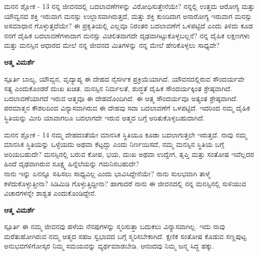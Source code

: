 \begin{mananam}{\mananamfont ಮನನ ಶ್ಲೋಕ - \textenglish{13}}
\footnotesize \mananamtext ನನ್ನ ಜೀವನದಲ್ಲಿ ಬದಲಾವಣೆಗಳನ್ನು ವಿರೋಧಿಸುತ್ತೇನೆಯೇ? ನನ್ನಲ್ಲಿ ಉತ್ತಮ ಆರೋಗ್ಯ ಮತ್ತು ಯೌವ್ವನದ ಶಕ್ತಿ ಇರುವಾಗ ಮನಸ್ಸು ಉಲ್ಲಾಸವಾಗಿರುತ್ತದೆ, ಮತ್ತು ಶಕ್ತಿ ಕುಂದಿದಾಗ ಅನಾರೋಗ್ಯ ಇರುವಾಗ ಮನಸ್ಸು ಅಸಮಾಧಾನ ಗೊಳ್ಳುತ್ತದೆಯೇ? ಈ ಪ್ರಕೃತಿಯಲ್ಲಿ ಎಲ್ಲವೂ ನಿರಂತರ ಬದಲಾವಣೆಗೆ ಒಳಪಟ್ಟಿದೆ ಎಂದು ತಿಳಿದು ಕೂಡ ನನಗೆ ದೈಹಿಕ ಬದಲಾವಣೆಗಳಾದಾಗ ಮನಸ್ಸು ವಿಚಲಿತವಾಗದೇ ದೃಢವಾಗಿಟ್ಟುಕೊಳ್ಳಬಲ್ಲನೆ? ನನ್ನ ದೈಹಿಕ ಲಕ್ಷಣಗಳು ಮತ್ತು ಮನಸ್ಸಿನ ಆಧಾರದ ಮೇಲೆ ನನ್ನ ಜೀವನದ ಮಿತಿಗಳನ್ನು ನನ್ನ ಮೇಲೆ ಹೇರಿಕೊಳ್ಳಲು ಸಾಧ್ಯವೇ?
\end{mananam}
\WritingHand\enspace\textbf{ಆತ್ಮ ವಿಮರ್ಶೆ}
\begin{inspiration}{\mananamfont ಸ್ಪೂರ್ತಿ}
\footnotesize \mananamtext ಬಾಲ್ಯ, ಯೌವ್ವನ, ವೃದ್ಯಾಪ್ಯ ಈ ದೇಹದ ನೈಸರ್ಗಿಕ ಪ್ರಕ್ರಿಯೆಯಾಗಿದೆ. ಯೌವನದಲ್ಲಿರುವ ಸೌಂದರ್ಯವೇ ಸತ್ಯ ಎಂದುಕೊಂಡರೆ ದುಃಖ ಖಚಿತ. ಮನಸ್ಸಿನ ನಿರ್ಮಲತೆ, ಶುದ್ಧತೆ ದೈಹಿಕ ಸೌಂದರ್ಯಕ್ಕಿಂತ ಶ್ರೇಷ್ಠವಾಗಿದೆ. ಬದಲಾವಣೆಯಾಗದೆ ಇರುವ ಆತ್ಮವೂ ಈ ದೇಹದೊಂದಿಗಿದೆ. ಈ ಆತ್ಮ ಸೌಂದರ್ಯವೂ ಅತ್ಯಂತ ಶ್ರೇಷ್ಠವಾಗಿದೆ. ಪರಮಾತ್ಮನ ಕೌಶಲದಿಂದ ವಿನ್ಯಾಸವಾಗಿರುವ ಈ ದೇಹವು ಸದಾ ಬದಲಾವಣೆಗೆ ಒಳಪಟ್ಟಿದೆ. ಇದರಿಂದ ನಮ್ಮ ದೈಹಿಕ ಸ್ಥಿತಿಯನ್ನು ಮೀರಿ ಯಾವಾಗಲೂ ಬದಲಾಗದೇ ಇರುವ ಆತ್ಮದ ಬಗ್ಗೆ ಅರಿತುಕೊಳ್ಳಬಹುದಾಗಿದೆ.
\end{inspiration}
\newpage

\begin{mananam}{\mananamfont ಮನನ ಶ್ಲೋಕ - \textenglish{14}}
\footnotesize \mananamtext ನಮ್ಮ ದೇಹದಂತೆಯೇ ಮಾನಸಿಕ ಸ್ಥಿತಿಯೂ ಕೂಡಾ ಬದಲಾಗುತ್ತಲೇ ಇರುತ್ತದೆ. ನಾವು ನಮ್ಮ ಮಾನಸಿಕ ಸ್ಥಿತಿಯನ್ನು ಒಳ್ಳೆಯದು ಅಥವಾ ಕೆಟ್ಟದ್ದು ಎಂದು ನಿರ್ಣಯಿಸದೆ, ನಮ್ಮ ಮನಸ್ಸಿನ ಸ್ಥಿತಿಯ ಬಗ್ಗೆ ಅರಿಯಬಹುದೇ? ಮನಸ್ಸಿನಲ್ಲಿ ಬರುವ ಕೋಪ, ಭಯ, ದುಃಖ ಅಥವಾ ಉದ್ವೇಗ, ತೃಪ್ತಿ ಮತ್ತು ಸಂತೋಷ ಇವೆಲ್ಲದರ ಹಿಂದೆ ದೃಢವಾಗಿರುವ ಸೂಕ್ಷ್ಮ ಹಿನ್ನೆಲೆಯನ್ನು  ಗಮನಿಸಬಹುದೇ?\\
ನಾನು ಇನ್ನು ಏನನ್ನೂ ಸಹಿಸಲು ಸಾಧ್ಯವಿಲ್ಲ ಎಂದು ಭಾವಿಸಿದ್ದೇನೆಯೇ? ನಾನು ಸುಲಭವಾಗಿ ತಾಳ್ಮೆ ಕಳೆದುಕೊಳ್ಳುತ್ತೀನಾ? ಸಿಡಿಮಿಡಿ ಗೊಳ್ಳುತ್ತಿದ್ದೀನಾ?  ಹಾಗಾದರೆ ನಾನು ಈ ಜೀವನದಲ್ಲಿ ನನ್ನ ಮನಸ್ಸಿನಲ್ಲಿ ಸುಳಿಯುವ ವಿಚಾರಗಳನ್ನೇ ಶಾಶ್ವತ ಎಂದುಕೊಂಡಿದ್ದೇನೆ.
\end{mananam}
\WritingHand\enspace\textbf{ಆತ್ಮ ವಿಮರ್ಶೆ}
\begin{inspiration}{\mananamfont ಸ್ಪೂರ್ತಿ}
\footnotesize \mananamtext ಈ ನಮ್ಮ ಜೀವನವು ಹಳೆಯ ನೆನಪುಗಳನ್ನು ಸ್ಮರಿಸುತ್ತಾ ಬದುಕಲು ವಿನ್ಯಾಸವಾಗಿಲ್ಲ. ಇದು ನಾವು ಮರೆತುಹೋಗಿರುವ ನಮ್ಮ ಆತ್ಮದ ಸಹಜ ಸ್ವಭಾವದ ಬಗ್ಗೆ ಸ್ಮರಿಸಬೇಕಾಗಿದೆ. ಕ್ಷಣಿಕ ಸಂತೋಷ ಕೊಡುವ ಸಣ್ಣಪುಟ್ಟ ಅನುಭವಗಳಿಗೋಸ್ಕರ ನಿಮ್ಮ ಸಮಯವನ್ನು ವ್ಯರ್ಥಮಾಡಬೇಡಿ.  ಆನಂದವು ನಿಮ್ಮ ಜನ್ಮ ಸಿದ್ಧ ಹಕ್ಕು.
\end{inspiration}
\newpage

